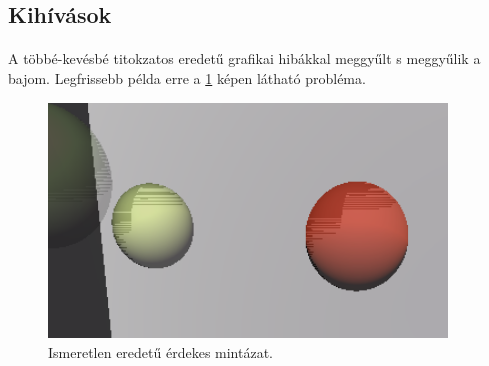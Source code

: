 \subsection{Kihívások}
\paragraph{}A többé-kevésbé titokzatos eredetű grafikai hibákkal meggyűlt s meggyűlik a bajom. Legfrissebb példa erre a \ref{img:tiger} képen látható probléma.

\begin{figure}[!b]
	\centering
	\label{img:tiger}
	\caption{Ismeretlen eredetű érdekes mintázat.}
	\includegraphics[width=300pt, keepaspectratio]{tigerprint.png}
\end{figure}
